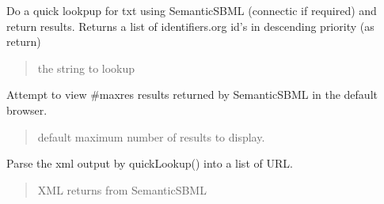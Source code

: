 \documentclass[letterpaper,12pt,english]{sphinxmanual}
\begin{document}
\begin{fulllineitems}
\begin{fulllineitems}
\label{\detokenize{api/networking:cbmpy.CBNetDB.SemanticSBML.quickLookup}}
\pysigstartsignatures
\pysiglinewithargsret
{}
{}
{}
\pysigstopsignatures
\sphinxAtStartPar
Do a quick lookpup for txt using SemanticSBML (connectic if required) and return results. Returns a list of identifiers.org id’s in descending priority (as return)
\begin{quote}\begin{description}
\sphinxAtStartPar
{} \textendash{} the string to lookup

\end{description}\end{quote}

\end{fulllineitems}


\begin{fulllineitems}
\label{\detokenize{api/networking:cbmpy.CBNetDB.SemanticSBML.viewDataInWebrowser}}
\pysigstartsignatures
\pysiglinewithargsret
{}
{}
{}
\pysigstopsignatures
\sphinxAtStartPar
Attempt to view \#maxres results returned by SemanticSBML in the default browser.
\begin{quote}\begin{description}
\sphinxAtStartPar
{} \textendash{} default maximum number of results to display.

\end{description}\end{quote}

\end{fulllineitems}


\begin{fulllineitems}
\label{\detokenize{api/networking:cbmpy.CBNetDB.SemanticSBML.parseXMLtoText}}
\pysigstartsignatures
\pysiglinewithargsret
{}
{}
{}
\pysigstopsignatures
\sphinxAtStartPar
Parse the xml output by quickLookup() into a list of URL.
\begin{quote}\begin{description}
\sphinxAtStartPar
{} \textendash{} XML returns from SemanticSBML


\end{description}
\end{quote}
\end{fulllineitems}
\end{fulllineitems}
\end{document}
